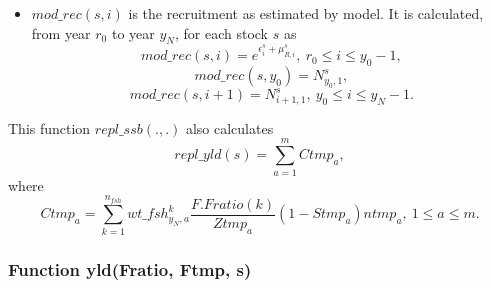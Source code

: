 \documentclass{article}
\begin{document}
\begin{itemize}
    \item  $mod\_rec(s,i)$ is the recruitment as estimated by model. It is calculated, from year $r_0$ to year $y_N$, for each stock $s$ as
     \begin{equation}
        mod\_rec(s,i)=e^{\epsilon^s_i+\mu^s_{R,i}}, \ r_0\leq i \leq y_0-1,
    \end{equation}
    \begin{equation}
        mod\_rec(s,y_0)=N^s_{y_0,1},
    \end{equation}
    \begin{equation}
        mod\_rec(s,i+1)=N^s_{i+1,1}, \ y_0\leq i \leq y_N-1.
    \end{equation}
   
\end{itemize}
This function $repl\_ssb(.,.)$ also calculates
\begin{equation}
    repl\_yld(s)=\sum_{a=1}^m Ctmp_a,
\end{equation}
where
\begin{equation}
    Ctmp_a=\sum_{k=1}^{n_{fsh}} wt\_fsh^{k}_{y_N,a}\dfrac{F. Fratio(k)}{Ztmp_a}(1-Stmp_a)ntmp_a, \ 1\leq a \leq m.
\end{equation}

\subsubsection{Function yld(Fratio, Ftmp, s)} \label{yld}
\end{document}

